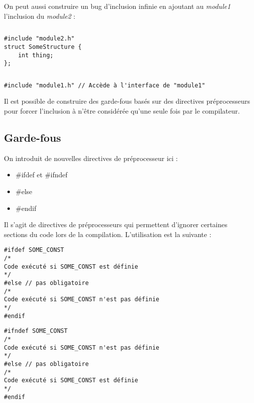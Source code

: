 \documentclass[../../../main.tex]{subfiles}
\begin{document}
On peut aussi construire un bug d'inclusion infinie en ajoutant au \textit{module1} l'inclusion du \textit{module2} :
\begin{lstlisting}[title=module1.h]
\end{lstlisting}
\begin{verbatim}
#include "module2.h"
struct SomeStructure {
	int thing;
};
\end{verbatim}
\begin{lstlisting}[title=module2.h]
\end{lstlisting}
\begin{verbatim}
#include "module1.h" // Accède à l'interface de "module1"
\end{verbatim}
Il est possible de construire des garde-fous basés sur des directives préprocesseurs pour forcer l'inclusion à n'être considérée qu'une seule fois par le compilateur.
\subsection{Garde-fous}
\label{sub:garde_fous}
On introduit de nouvelles directives de préprocesseur ici : 
\begin{itemize}
	\item \textsf{\#ifdef} et \textsf{\#ifndef}
	\item \textsf{\#else}
	\item \textsf{\#endif}
\end{itemize}
Il s'agit de directives de préprocesseurs qui permettent d'ignorer certaines sections du code lors de la compilation. L'utilisation est la suivante :

\begin{minipage}{0.5\textwidth}
	\begin{verbatim}
#ifdef SOME_CONST
/*
Code exécuté si SOME_CONST est définie
*/
#else // pas obligatoire
/*
Code exécuté si SOME_CONST n'est pas définie
*/
#endif
\end{verbatim}
\end{minipage}
\begin{minipage}{0.5\textwidth}
\begin{verbatim}
#ifndef SOME_CONST
/*
Code exécuté si SOME_CONST n'est pas définie
*/
#else // pas obligatoire
/*
Code exécuté si SOME_CONST est définie
*/
#endif
\end{verbatim}
\end{minipage}
\end{document}
